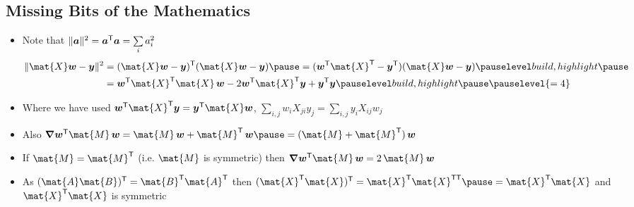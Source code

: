 
\begin{slide}
\section[-1]{Missing Bits of the Mathematics}

\begin{PauseHighLight}
  \begin{itemize}
  \item Note that $\| \bm{a} \|^2 = \bm{a}^{\textsf{T}} \bm{a} = \sum\limits_i a_i^2$\pause
    \begin{align*}
      \| \mat{X} \bm{w} - \bm{y}\|^2 &= (\mat{X} \bm{w} -
      \bm{y})^\tr(\mat{X} \bm{w} - \bm{y})\pause = (\bm{w}^\tr \mat{X}
                                       ^\tr - \bm{y}^\tr)(\mat{X}
                                       \bm{w} - \bm{y})\pauseb\\
      &=\bm{w}^\tr
      \mat{X}^\tr\mat{X} \, \bm{w} -  2 \bm{w}^\tr\mat{X}^\tr \bm{y} +
      \bm{y}^\tr  \bm{y}\pauseb\pauselevel{=4}
    \end{align*}
  \item Where we have used $\bm{w}^\tr\mat{X}^\tr \bm{y} =
    \bm{y}^\tr\mat{X} \bm{w}$\pause{}, $\sum\limits_{i,j} w_i X_{ji} y_j
    = \sum\limits_{i,j} y_i X_{ij} w_j$\pauseb
  \item Also $\grad \bm{w}^\tr \mat{M}\, \bm{w} = \mat{M}\,\bm{w} +
    \mat{M}^\tr\, \bm{w}\pause = (\mat{M} + \mat{M}^\tr)\, \bm{w}$\pauseb
  \item If $\mat{M}=\mat{M}^\tr$ (i.e.{} $\mat{M}$ is symmetric) then
    $\grad \bm{w}^\tr \mat{M}\, \bm{w} = 2\,\mat{M}\,\bm{w}$\pause
  \item As $(\mat{A}\mat{B})^\tr = \mat{B}^\tr \mat{A}^\tr$ then $(\mat{X}^\tr\mat{X})^\tr = \mat{X}^\tr\mat{X}^{\tr\tr}\pause=\mat{X}^\tr\mat{X}$ and
    $\mat{X}^\tr\mat{X}$ is symmetric\pauseb
  \end{itemize}
\end{PauseHighLight}

\end{slide}


\Outline %

